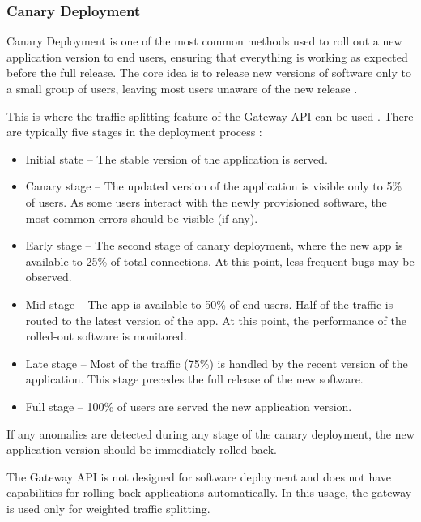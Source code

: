 \subsubsection{Canary Deployment}
\label{subsubsection:canary}

Canary Deployment is one of the most common methods used to roll out a new application version to end users, ensuring that everything is working as expected before the full release. The core idea is to release new versions of software only to a small group of users, leaving most users unaware of the new release \cite{Canary}.

This is where the traffic splitting feature of the Gateway API can be used \cite{CiliumTrafficSplitting}. There are typically five stages in the deployment process \cite{Canary}:

\begin{itemize}
    \item Initial state -- The stable version of the application is served.
    \item Canary stage -- The updated version of the application is visible only to 5\% of users. As some users interact with the newly provisioned software, the most common errors should be visible (if any).
    \item Early stage -- The second stage of canary deployment, where the new app is available to 25\% of total connections. At this point, less frequent bugs may be observed.
    \item Mid stage -- The app is available to 50\% of end users. Half of the traffic is routed to the latest version of the app. At this point, the performance of the rolled-out software is monitored.
    \item Late stage -- Most of the traffic (75\%) is handled by the recent version of the application. This stage precedes the full release of the new software.
    \item Full stage -- 100\% of users are served the new application version.
\end{itemize}

If any anomalies are detected during any stage of the canary deployment, the new application version should be immediately rolled back.

The Gateway API is not designed for software deployment and does not have capabilities for rolling back applications automatically. In this usage, the gateway is used only for weighted traffic splitting.

